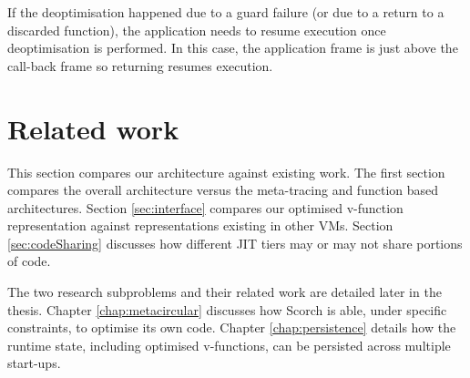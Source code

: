 \documentclass[a4paper,12pt,twoside]{../includes/ThesisStyle}
\begin{document}
If the deoptimisation happened due to a guard failure (or due to a return to a discarded function), the application needs to resume execution once deoptimisation is performed. In this case, the application frame is just above the call-back frame so returning resumes execution. %




\section{Related work}
\label{sec:relatedWorkArch}

This section compares our architecture against existing work. The first section compares the overall architecture versus the meta-tracing and function based architectures. Section \ref{sec:interface} compares our optimised v-function representation against representations existing in other VMs. Section \ref{sec:codeSharing} discusses how different JIT tiers may or may not share portions of code.

The two research subproblems and their related work are detailed later in the thesis. Chapter \ref{chap:metacircular} discusses how Scorch is able, under specific constraints, to optimise its own code. Chapter \ref{chap:persistence} details how the runtime state, including optimised v-functions, can be persisted across multiple start-ups.
\end{document}
